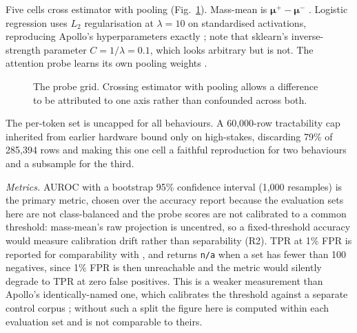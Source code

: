 \documentclass[conference]{IEEEtran}
\begin{document}
Five cells cross estimator with pooling (Fig.~\ref{fig:grid}). Mass-mean is
$\boldsymbol{\mu}^{+}-\boldsymbol{\mu}^{-}$ \citep{marks2024}. Logistic
regression uses $L_2$ regularisation at $\lambda=10$ on standardised
activations, reproducing Apollo's hyperparameters exactly
\citep{goldowsky2025}; note that sklearn's inverse-strength parameter
$C = 1/\lambda = 0.1$, which looks arbitrary but is not. The attention probe
learns its own pooling weights \citep{mckenzie2025,kantamneni2025}.

\begin{figure}[t]
\centering
{}
\caption{The probe grid. Crossing estimator with pooling allows a difference to be
attributed to one axis rather than confounded across both.}
\label{fig:grid}
\end{figure}

The per-token set is uncapped for all behaviours. A 60{,}000-row tractability
cap inherited from earlier hardware bound only on high-stakes, discarding 79\% of
285{,}394 rows and making this one cell a faithful reproduction for two
behaviours and a subsample for the third.

\emph{Metrics.} AUROC with a bootstrap 95\% confidence interval (1{,}000
resamples) is the primary metric, chosen over the accuracy \citet{marks2024}
report because the evaluation sets here are not class-balanced and the probe
scores are not calibrated to a common threshold: mass-mean's raw projection is
uncentred, so a fixed-threshold accuracy would measure calibration drift
rather than separability (R2). TPR at 1\% FPR is reported for comparability with
\citet{mckenzie2025}, and returns \texttt{n/a} when a set has fewer than 100
negatives, since 1\% FPR is then unreachable and the metric would silently
degrade to TPR at zero false positives. This is a weaker measurement than
Apollo's identically-named one, which calibrates the threshold against a separate
control corpus \citep{taori2023}; without such a split the figure here is
computed within each evaluation set and is not comparable to theirs.
\end{document}
